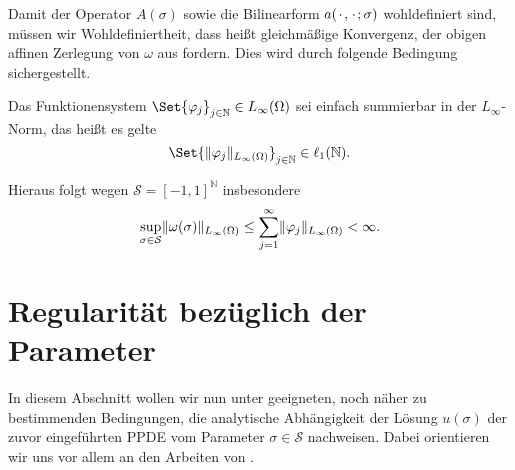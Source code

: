 Damit der Operator $A(\sigma)$ sowie die Bilinearform $a({\mkern2mu\cdot\mkern2mu}, {\mkern2mu\cdot\mkern2mu}; \sigma)$ wohldefiniert sind, müssen wir Wohldefiniertheit, dass heißt gleichmäßige Konvergenz, der obigen affinen Zerlegung von $\omega$ aus  fordern.
Dies wird durch folgende Bedingung sichergestellt.
\begin{Annahme}
    Das Funktionensystem $\Set{ \varphi_{j} }_{j \in \mathbb{N}} \in L_{\infty}(\Omega)$ sei einfach summierbar in der $L_{\infty}$-Norm, das heißt es gelte
    \begin{equation}
        \Set{ \norm{\varphi_{j}}_{L_{\infty}(\Omega) } }_{j \in \mathbb{N}} \in \ell_{1}(\mathbb{N}).
    \end{equation}
\end{Annahme}
Hieraus folgt wegen $\mathcal S = [-1, 1]^{\mathbb{N}}$ insbesondere
\begin{equation}
    \sup_{\sigma \in \mathcal S} \lVert\omega(\sigma)\rVert_{L_{\infty}(\Omega)} \leq \sum_{j = 1}^{\infty} \lVert\varphi_{j}\rVert_{L_{\infty}(\Omega)} < \infty.
\end{equation}



\section{Regularität bezüglich der Parameter} %
\label{sec:regularit_t_bez_glich_der_parameter}

In diesem Abschnitt wollen wir nun unter geeigneten, noch näher zu bestimmenden Bedingungen, die analytische Abhängigkeit der Lösung $u(\sigma)$ der zuvor eingeführten PPDE vom Parameter $\sigma \in \mathcal S$ nachweisen.
Dabei orientieren wir uns vor allem an den Arbeiten von \textcite{Cohen:2010kz,Kunoth:2013ef}.


